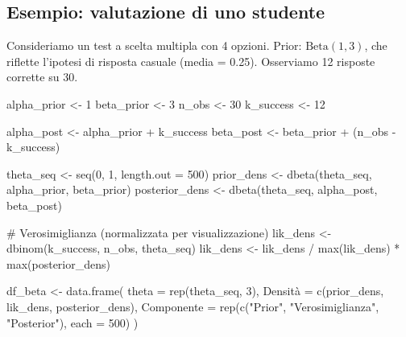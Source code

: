 \documentclass[
  italian,
  letterpaper,
  a4paper,
  11pt,
  open=any]{scrbook}
\newenvironment{Shaded}{\begin{snugshade}}{\end{snugshade}}
\newcommand{\AttributeTok}[1]{\textcolor[rgb]{0.40,0.45,0.13}{#1}}
\newcommand{\CommentTok}[1]{\textcolor[rgb]{0.37,0.37,0.37}{#1}}
\newcommand{\DecValTok}[1]{\textcolor[rgb]{0.68,0.00,0.00}{#1}}
\newcommand{\FunctionTok}[1]{\textcolor[rgb]{0.28,0.35,0.67}{#1}}
\newcommand{\NormalTok}[1]{\textcolor[rgb]{0.00,0.23,0.31}{#1}}
\newcommand{\OtherTok}[1]{\textcolor[rgb]{0.00,0.23,0.31}{#1}}
\newcommand{\SpecialCharTok}[1]{\textcolor[rgb]{0.37,0.37,0.37}{#1}}
\newcommand{\StringTok}[1]{\textcolor[rgb]{0.13,0.47,0.30}{#1}}
\theoremstyle{plain}
\theoremstyle{definition}
\theoremstyle{definition}
\theoremstyle{remark}
\begin{document}
\subsection{Esempio: valutazione di uno
studente}\label{esempio-valutazione-di-uno-studente}

Consideriamo un test a scelta multipla con 4 opzioni. Prior:
\(\text{Beta}(1,3)\), che riflette l'ipotesi di risposta casuale (media
= 0.25). Osserviamo 12 risposte corrette su 30.

\begin{Shaded}
\begin{Highlighting}[]
\NormalTok{alpha\_prior }\OtherTok{\textless{}{-}} \DecValTok{1}
\NormalTok{beta\_prior }\OtherTok{\textless{}{-}} \DecValTok{3}
\NormalTok{n\_obs }\OtherTok{\textless{}{-}} \DecValTok{30}
\NormalTok{k\_success }\OtherTok{\textless{}{-}} \DecValTok{12}

\NormalTok{alpha\_post }\OtherTok{\textless{}{-}}\NormalTok{ alpha\_prior }\SpecialCharTok{+}\NormalTok{ k\_success}
\NormalTok{beta\_post }\OtherTok{\textless{}{-}}\NormalTok{ beta\_prior }\SpecialCharTok{+}\NormalTok{ (n\_obs }\SpecialCharTok{{-}}\NormalTok{ k\_success)}

\NormalTok{theta\_seq }\OtherTok{\textless{}{-}} \FunctionTok{seq}\NormalTok{(}\DecValTok{0}\NormalTok{, }\DecValTok{1}\NormalTok{, }\AttributeTok{length.out =} \DecValTok{500}\NormalTok{)}
\NormalTok{prior\_dens }\OtherTok{\textless{}{-}} \FunctionTok{dbeta}\NormalTok{(theta\_seq, alpha\_prior, beta\_prior)}
\NormalTok{posterior\_dens }\OtherTok{\textless{}{-}} \FunctionTok{dbeta}\NormalTok{(theta\_seq, alpha\_post, beta\_post)}

\CommentTok{\# Verosimiglianza (normalizzata per visualizzazione)}
\NormalTok{lik\_dens }\OtherTok{\textless{}{-}} \FunctionTok{dbinom}\NormalTok{(k\_success, n\_obs, theta\_seq)}
\NormalTok{lik\_dens }\OtherTok{\textless{}{-}}\NormalTok{ lik\_dens }\SpecialCharTok{/} \FunctionTok{max}\NormalTok{(lik\_dens) }\SpecialCharTok{*} \FunctionTok{max}\NormalTok{(posterior\_dens)}

\NormalTok{df\_beta }\OtherTok{\textless{}{-}} \FunctionTok{data.frame}\NormalTok{(}
  \AttributeTok{theta =} \FunctionTok{rep}\NormalTok{(theta\_seq, }\DecValTok{3}\NormalTok{),}
\NormalTok{  Densità }\OtherTok{=} \FunctionTok{c}\NormalTok{(prior\_dens, lik\_dens, posterior\_dens),}
  \AttributeTok{Componente =} \FunctionTok{rep}\NormalTok{(}\FunctionTok{c}\NormalTok{(}\StringTok{"Prior"}\NormalTok{, }\StringTok{"Verosimiglianza"}\NormalTok{, }\StringTok{"Posterior"}\NormalTok{), }\AttributeTok{each =} \DecValTok{500}\NormalTok{)}
\NormalTok{)}


\end{Highlighting}
\end{Shaded}
\end{document}
